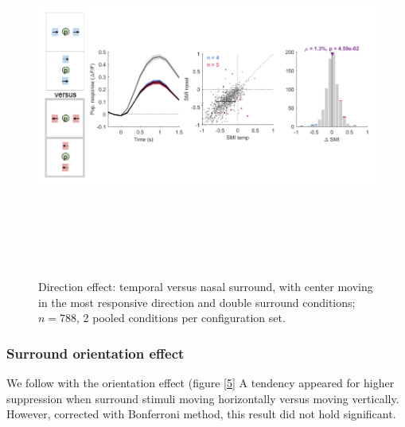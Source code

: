 \begin{figure}[H] \centering \includegraphics[width=12cm,height=12cm,keepaspectratio]{Figures/7.Results/finalPopulation/sel/diagrams/4.png} 
\caption{Direction effect: temporal versus nasal surround, with center moving in the most responsive direction and double surround conditions;  $n=788$, 2 pooled conditions per configuration set.} 
\label{4}
\end{figure}

\subsubsection{Surround orientation effect}

We follow with the orientation effect (figure \ref{5} A tendency appeared for higher suppression when surround stimuli moving horizontally versus moving vertically. However, corrected with Bonferroni method, this result did not hold significant.

